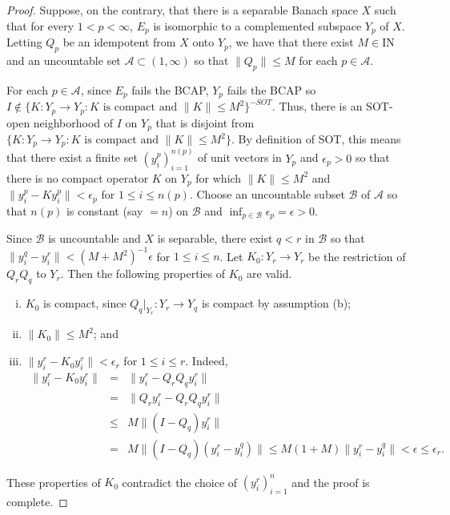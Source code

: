 \documentclass[11pt]{amsart}
\theoremstyle{definition}
\numberwithin{equation}{section}
\begin{document}
\begin{proof}
Suppose, on the contrary, that there is a separable Banach space $X$ such that for every $1<p<\infty$, $E_{p}$ is isomorphic to a complemented subspace $Y_{p}$ of $X$.
Letting $Q_{p}$ be an idempotent from $X$ onto $Y_{p}$, we have that there exist $M\in{\mathrm{I\!N\!}}\,$ and an uncountable set $\mathscr{A}\subset (1,\infty)$ so that $\|Q_{p}\|
\leq M$ for each $p\in\mathscr{A}$.

For each $p\in\mathscr{A}$, since $E_{p}$ fails the BCAP, $Y_{p}$ fails the BCAP so $I\notin\{K:Y_{p}\to Y_{p}:K\text{ is compact and }\|K\|\leq M^{2}\}^{-SOT}$. Thus,
there is an SOT-open neighborhood of $I$ on $Y_{p}$ that is disjoint from $\{K:Y_{p}\to Y_{p}:K\text{ is compact and }\|K\|\leq M^{2}\}$. By definition of SOT, this means
that there exist a finite set $(y_{i}^{p})_{i=1}^{n(p)}$ of unit vectors in $Y_{p}$ and $\epsilon_{p}>0$ so that there is no compact operator $K$ on $Y_{p}$ for which
$\|K\|\leq M^{2}$ and $\|y_{i}^{p}-Ky_{i}^{p}\|<\epsilon_{p}$ for $1\leq i\leq n(p)$. Choose an uncountable subset $\mathscr{B}$ of $\mathscr{A}$ so that $n(p)$ is
constant (say $=n$) on $\mathscr{B}$ and $\displaystyle\inf_{p\in\mathscr{B}}\epsilon_{p}=\epsilon>0$.

Since $\mathscr{B}$ is uncountable and $X$ is separable, there exist $q<r$ in $\mathscr{B}$ so that $\|y_{i}^{q}-y_{i}^{r}\|<(M+M^{2})^{-1}\epsilon$ for
$1\leq i\leq n$. Let $K_{0}:Y_{r}\to Y_{r}$ be the restriction of $Q_{r}Q_{q}$ to $Y_{r}$. Then the following properties of $K_{0}$ are valid.
\begin{enumerate}[(i)]
\item $K_{0}$ is compact, since $Q_{q}|_{Y_{r}}:Y_{r}\rightarrow Y_{q}$ is compact by assumption (b);
\item $\|K_{0}\|\leq M^{2}$; and
\item $\|y_{i}^{r}-K_{0}y_{i}^{r}\|<\epsilon_{r}$ for $1\leq i\leq r$. Indeed,
\begin{eqnarray*}
\|y_{i}^{r}-K_{0}y_{i}^{r}\|&=&\|y_{i}^{r}-Q_{r}Q_{q}y_{i}^{r}\|\\&=&\|Q_{r}y_{i}^{r}-Q_{r}Q_{q}y_{i}^{r}\|\\&\leq&M\|(I-Q_{q})y_{i}^{r}\|\\&=&M\|(I-Q_{q})(y_{i
}^{r}-y_{i}^{q})\|\leq M(1+M)\|y_{i}^{r}-y_{i}^{q}\|<\epsilon\leq\epsilon_{r}.
\end{eqnarray*}
\end{enumerate}
These properties of $K_{0}$ contradict the choice of $(y_{i}^{r})_{i=1}^{n}$ and the proof is complete.
\end{proof}
\end{document}
